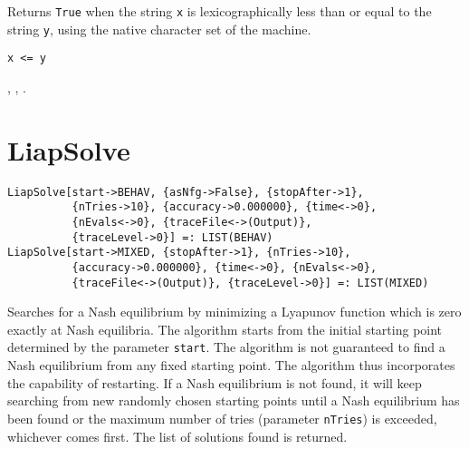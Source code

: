 \noindent
Returns \verb+True+ when the string \verb+x+ is lexicographically less than
or equal to the string \verb+y+, using the native character set of the machine.

\shortform \verb+x <= y+

\seealso {},
,
.


\section*{LiapSolve}\label{PrimLiapSolve}
\begin{verbatim}
LiapSolve[start->BEHAV, {asNfg->False}, {stopAfter->1}, 
          {nTries->10}, {accuracy->0.000000}, {time<->0}, 
          {nEvals<->0}, {traceFile<->(Output)}, 
          {traceLevel->0}] =: LIST(BEHAV)
LiapSolve[start->MIXED, {stopAfter->1}, {nTries->10}, 
          {accuracy->0.000000}, {time<->0}, {nEvals<->0}, 
          {traceFile<->(Output)}, {traceLevel->0}] =: LIST(MIXED)
\end{verbatim}

\noindent
Searches for a Nash equilibrium by minimizing a Lyapunov function
which is zero exactly at Nash equilibria.  The algorithm starts from
the initial starting point determined by the parameter \verb+start+.
The algorithm is not guaranteed to find a Nash equilibrium from any
fixed starting point.  The algorithm thus incorporates the capability
of restarting.  If a Nash equilibrium is not found, it will keep
searching from new randomly chosen starting points until a Nash
equilibrium has been found or the maximum number of tries (parameter
\verb+nTries+) is exceeded, whichever comes first.  The list of
solutions found is returned.

